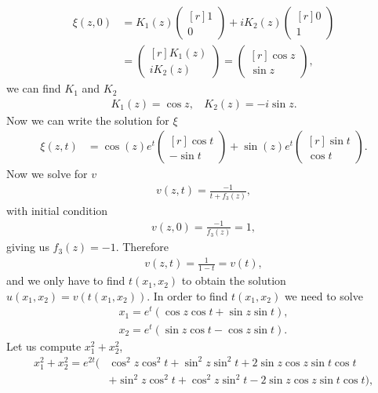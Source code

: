 \begin{questions}
\begin{solution}
\begin{align*}
\xi(z,0)&=K_1(z)\begin{pmatrix*}[r]
1\\
0
\end{pmatrix*}+iK_2(z)\begin{pmatrix*}[r]
0\\
1
\end{pmatrix*}\\
&=\begin{pmatrix*}[r]
K_1(z)\\
iK_2(z)
\end{pmatrix*}=\begin{pmatrix*}[r]
\cos{z}\\
\sin{z}
\end{pmatrix*},
\end{align*}
we can find $K_1$ and $K_2$
\begin{align*}
K_1(z)=\cos{z},~~~~K_2(z)=-i\sin{z}.
\end{align*}
Now we can write the solution for $\xi$
\begin{align*}
\xi(z,t)&=\cos{(z)}e^t\begin{pmatrix*}[r]
\cos{t}\\
-\sin{t}
\end{pmatrix*}+\sin{(z)}e^t\begin{pmatrix*}[r]
\sin{t}\\
\cos{t}
\end{pmatrix*}.
\end{align*}
Now we solve for $v$
\begin{align*}
v(z,t)=\frac{-1}{t+f_3(z)},
\end{align*}
with initial condition
\begin{align*}
v(z,0)=\frac{-1}{f_3(z)}=1,
\end{align*}
giving us $f_3(z)=-1$. Therefore
\begin{align*}
v(z,t)=\frac{1}{1-t}=v(t),
\end{align*}
and we only have to find $t(x_1,x_2)$ to obtain the solution $u(x_1,x_2)=v(t(x_1,x_2))$. In order to find $t(x_1,x_2)$ we need to solve
\begin{align*}
x_1=e^t\left(\cos{z}\cos{t}+\sin{z}\sin{t}\right),\\
x_2=e^t\left(\sin{z}\cos{t}-\cos{z}\sin{t}\right).
\end{align*}
Let us compute $x_1^2+x_2^2$,
\begin{align*}
x_1^2+x_2^2=e^{2t}(&\cos^2{z}\cos^2{t}+\sin^2{z}\sin^2{t}+2\sin{z}\cos{z}\sin{t}\cos{t}\\
&+\sin^2{z}\cos^2{t}+\cos^2{z}\sin^2{t}-2\sin{z}\cos{z}\sin{t}\cos{t}),

\end{align*}
\end{solution}
\end{questions}
